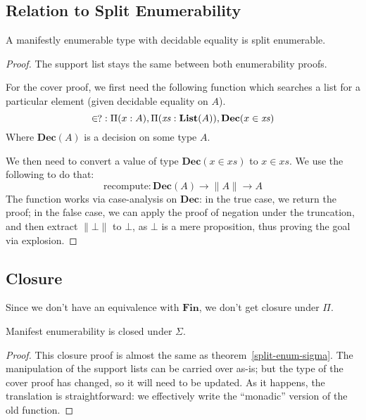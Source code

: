 \subsection{Relation to Split Enumerability}
\begin{rm-theorem} \label{manifest-enum-to-split}
  A manifestly enumerable type with decidable equality is split enumerable.
\end{rm-theorem}
\begin{proof}
  The support list stays the same between both enumerability proofs.

  For the cover proof, we first need the following function which searches a
  list for a particular element (given decidable equality on \(A\)).
  \begin{equation}
    \decin \; : \Pi(x : A) , \Pi(\mathit{xs} : \mathbf{List}(A)) , \mathbf{Dec}(x \in \mathit{xs})
  \end{equation}
  Where \(\mathbf{Dec}(A)\) is a decision on some type \(A\).

  We then need to convert a value of type \(\mathbf{Dec}(x \in \mathit{xs})\) to
  \(x \in \mathit{xs}\).
  We use the following to do that:
  \begin{equation}
    \text{recompute} : \mathbf{Dec}(A) \rightarrow \lVert A \rVert \rightarrow A
  \end{equation}
  The function works via case-analysis on \(\mathbf{Dec}\): in the true case, we
  return the proof; in the false case, we can apply the proof of negation under
  the truncation, and then extract \(\lVert \bot \rVert\) to \(\bot\), as
  \(\bot\) is a mere proposition, thus proving the goal via explosion.
\end{proof}
\subsection{Closure}
Since we don't have an equivalence with \(\mathbf{Fin}\), we don't get closure
under \(\Pi\).
\begin{rm-lemma}
  Manifest enumerability is closed under \(\Sigma\).
\end{rm-lemma}
\begin{proof}
  This closure proof is almost the same as theorem~\ref{split-enum-sigma}.
  The manipulation of the support lists can be carried over as-is; but the type
  of the cover proof has changed, so it will need to be updated.
  As it happens, the translation is straightforward: we effectively write the
  ``monadic'' version of the old function.
\end{proof}
